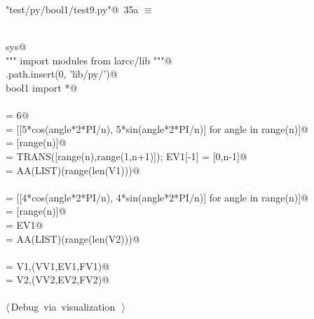 \documentclass[11pt,oneside]{article}	%
\begin{document}
\begin{flushleft} \small \label{scrap43}
\protect{}\verb@"test/py/bool1/test9.py"@\nobreak\ {\footnotesize 35a }$\equiv$
\vspace{-1ex}
\begin{list}{}{} \item
\mbox{}\verb@@\\
\mbox{}\verb@import sys@\\
\mbox{}\verb@""" import modules from larcc/lib """@\\
\mbox{}\verb@sys.path.insert(0, 'lib/py/')@\\
\mbox{}\verb@from bool1 import *@\\
\mbox{}\verb@@\\
\mbox{}\verb@n = 6@\\
\mbox{} = [[5*cos(angle*2*PI/n), 5*sin(angle*2*PI/n)] for angle in range(n)]@\\
\mbox{} = [range(n)]@\\
\mbox{} = TRANS([range(n),range(1,n+1)]); EV1[-1] = [0,n-1]@\\
\mbox{} = AA(LIST)(range(len(V1)))@\\
\mbox{}\verb@@\\
\mbox{} = [[4*cos(angle*2*PI/n), 4*sin(angle*2*PI/n)] for angle in range(n)]@\\
\mbox{} = [range(n)]@\\
\mbox{} = EV1@\\
\mbox{} = AA(LIST)(range(len(V2)))@\\
\mbox{}\verb@@\\
\mbox{} = V1,(VV1,EV1,FV1)@\\
\mbox{} = V2,(VV2,EV2,FV2)@\\
\mbox{}\verb@@\\
\mbox{}\verb@@\hbox{$\langle\,$Debug via visualization\nobreak\ {\footnotesize {}}$\,\rangle$}\verb@@\\
\mbox{}\verb@@{\NWsep}
\end{list}
\vspace{-2ex}
\end{flushleft}
\end{document}

